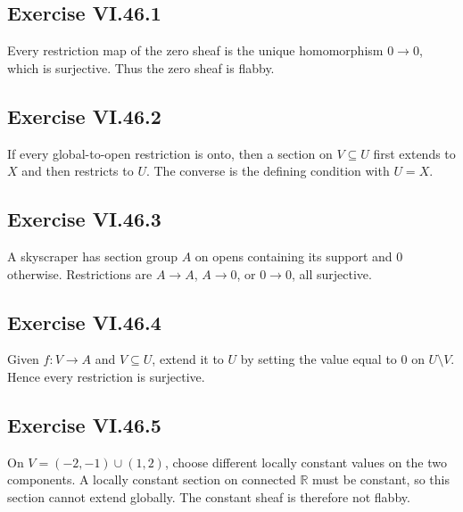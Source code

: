 \subsection*{Exercise VI.46.1}
\begin{solution}
Every restriction map of the zero sheaf is the unique homomorphism \(0\to0\), which is surjective.  Thus the zero sheaf is flabby.
\end{solution}

\subsection*{Exercise VI.46.2}
\begin{solution}
If every global-to-open restriction is onto, then a section on \(V\subseteq U\) first extends to \(X\) and then restricts to \(U\).  The converse is the defining condition with \(U=X\).
\end{solution}

\subsection*{Exercise VI.46.3}
\begin{solution}
A skyscraper has section group \(A\) on opens containing its support and \(0\) otherwise.  Restrictions are \(A\to A\), \(A\to0\), or \(0\to0\), all surjective.
\end{solution}

\subsection*{Exercise VI.46.4}
\begin{solution}
Given \(f:V\to A\) and \(V\subseteq U\), extend it to \(U\) by setting the value equal to \(0\) on \(U\setminus V\).  Hence every restriction is surjective.
\end{solution}

\subsection*{Exercise VI.46.5}
\begin{solution}
On \(V=(-2,-1)\cup(1,2)\), choose different locally constant values on the two components.  A locally constant section on connected \(\mathbb R\) must be constant, so this section cannot extend globally.  The constant sheaf is therefore not flabby.
\end{solution}

